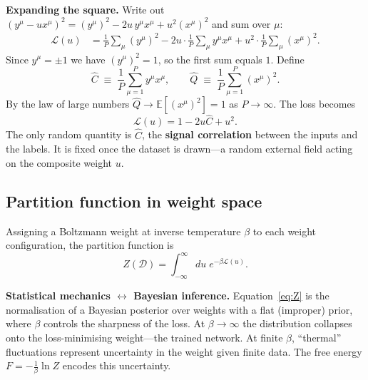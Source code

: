 \documentclass[nobib,justified]{tufte-handout}
\newcommand{\EE}{\mathbb{E}}
\newcommand{\cD}{\mathcal{D}}
\newcommand{\cL}{\mathcal{L}}
\begin{document}
\medskip
\noindent\textbf{Expanding the square.}  Write out
$(y^\mu - ux^\mu)^2 = (y^\mu)^2 - 2u\,y^\mu x^\mu + u^2(x^\mu)^2$
and sum over $\mu$:
\begin{align}
  \cL(u)
  &= \frac{1}{P}\sum_\mu(y^\mu)^2
    - 2u\cdot\frac{1}{P}\sum_\mu y^\mu x^\mu
    + u^2\cdot\frac{1}{P}\sum_\mu(x^\mu)^2.
  \label{eq:lossexp}
\end{align}
Since $y^\mu = \pm 1$ we have $(y^\mu)^2 = 1$, so the first sum equals
$1$.  Define
\begin{equation}
  \hat{C} \;\equiv\; \frac{1}{P}\sum_{\mu=1}^{P}y^\mu x^\mu,
  \qquad
  \hat{Q} \;\equiv\; \frac{1}{P}\sum_{\mu=1}^{P}(x^\mu)^2.
  \label{eq:CQ}
\end{equation}
By the law of large numbers $\hat{Q}\to\EE[(x^\mu)^2]=1$ as
$P\to\infty$.  The loss becomes
\begin{equation}
  \boxed{\cL(u) = 1 - 2u\hat{C} + u^{2}.}
  \label{eq:lossclean}
\end{equation}
The only random quantity is $\hat{C}$, the \textbf{signal correlation}
between the inputs and the labels.  It is fixed once the dataset is
drawn---a random external field acting on the composite weight $u$.

\subsection*{Partition function in weight space}

Assigning a Boltzmann weight at inverse temperature $\beta$ to each
weight configuration, the partition function is
\begin{equation}
  Z(\cD) = \int_{-\infty}^{\infty}du\;e^{-\beta\cL(u)}.
  \label{eq:Z}
\end{equation}

\begin{remarkbox}
\textbf{Statistical mechanics $\leftrightarrow$ Bayesian inference.}
Equation~\eqref{eq:Z} is the normalisation of a Bayesian posterior over
weights with a flat (improper) prior, where $\beta$ controls the
sharpness of the loss.  At $\beta\to\infty$ the distribution collapses
onto the loss-minimising weight---the trained network.  At finite
$\beta$, ``thermal'' fluctuations represent uncertainty in the weight
given finite data.  The free energy $F=-\frac{1}{\beta}\ln Z$ encodes
this uncertainty.
\end{remarkbox}
\end{document}
